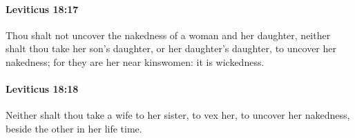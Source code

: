		\paragraph{Leviticus 18:17} %
			\label{LEVITICUS-18-17}

			Thou shalt not uncover the nakedness of a woman and her daughter, neither shalt thou take her son’s daughter, or her daughter’s daughter, to uncover her nakedness; for they are her near kinswomen: it is wickedness.


		\paragraph{Leviticus 18:18} %
			\label{LEVITICUS-18-18}

			Neither shalt thou take a wife to her sister, to vex her, to uncover her nakedness, beside the other in her life time.



